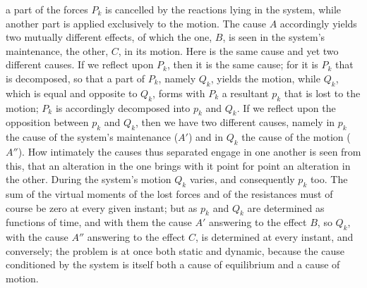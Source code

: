 \documentclass[12pt,a4paper]{book}
\begin{document}
a part of the forces $P_{k}$ is cancelled by the reactions lying in the system, while another
part is applied exclusively to the motion. The cause $A$ accordingly yields two mutually
different effects, of which the one, $B$, is seen in the system's maintenance, the other, $C$,
in its motion. Here is the same cause and yet two different causes. If we reflect upon
$P_{k}$, then it is the same cause; for it is $P_{k}$ that is decomposed, so that a
part of $P_{k}$, namely $Q_{k}$, yields the motion, while $Q_{k}$, which is equal and opposite
to $Q_{k}$, forms with $P_{k}$ a resultant $p_{k}$ that is lost to the motion; $P_{k}$ is
accordingly decomposed into $p_{k}$ and $Q_{k}$. If we reflect upon the opposition between
$p_{k}$ and $Q_{k}$, then we have two different causes, namely in $p_{k}$ the cause of the
system's maintenance ($A'$) and in $Q_{k}$ the cause of the motion ($A''$). How intimately the
causes thus separated engage in one another is seen from this, that an alteration in the one
brings with it point for point an alteration in the other. During the system's motion $Q_{k}$
varies, and consequently $p_{k}$ too. The sum of the virtual moments of the lost forces and of
the resistances must of course be zero at every given instant; but as $p_{k}$ and $Q_{k}$ are
determined as functions of time, and with them the cause $A'$ answering to the effect $B$, so
$Q_{k}$, with the cause $A''$ answering to the effect $C$, is determined at every instant, and
conversely; the problem is at once both static and dynamic, because the cause conditioned by
the system is itself both a cause of equilibrium and a cause of motion.
\end{document}
